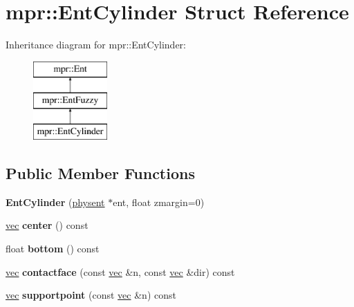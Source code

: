 \hypertarget{structmpr_1_1_ent_cylinder}{}\section{mpr\+:\+:Ent\+Cylinder Struct Reference}
\label{structmpr_1_1_ent_cylinder}
Inheritance diagram for mpr\+:\+:Ent\+Cylinder\+:\begin{figure}[H]
\begin{center}
\leavevmode
\includegraphics[height=3.000000cm]{structmpr_1_1_ent_cylinder}
\end{center}
\end{figure}
\subsection*{Public Member Functions}
\begin{DoxyCompactItemize}
\item 
\mbox{\label{structmpr_1_1_ent_cylinder_a7dd91820b727dc2c861b2da439980cee}} 
{\bfseries Ent\+Cylinder} (\hyperlink{structphysent}{physent} $\ast$ent, float zmargin=0)
\item 
\mbox{\label{structmpr_1_1_ent_cylinder_aa8b1fa57929c4ec2a6dec0729887b697}} 
\hyperlink{structvec}{vec} {\bfseries center} () const
\item 
\mbox{\label{structmpr_1_1_ent_cylinder_a38bd1c8a01b05403a3feacffe75a3f9c}} 
float {\bfseries bottom} () const
\item 
\mbox{\label{structmpr_1_1_ent_cylinder_a27f062f403e77e7b6341b87d0bc83fad}} 
\hyperlink{structvec}{vec} {\bfseries contactface} (const \hyperlink{structvec}{vec} \&n, const \hyperlink{structvec}{vec} \&dir) const
\item 
\mbox{\label{structmpr_1_1_ent_cylinder_a2fd84a92be8dd83bb553c823b82989d6}} 
\hyperlink{structvec}{vec} {\bfseries supportpoint} (const \hyperlink{structvec}{vec} \&n) const
\end{DoxyCompactItemize}
